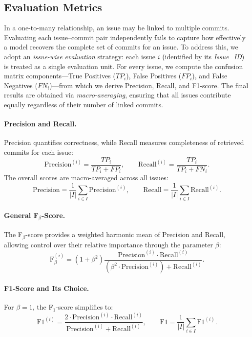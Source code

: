 
\subsection{Evaluation Metrics}

In a one-to-many relationship, an issue may be linked to multiple commits. Evaluating each issue--commit pair independently fails to capture how effectively a model recovers the complete set of commits for an issue. To address this, we adopt an \emph{issue-wise evaluation} strategy: each issue $i$ (identified by its \textit{Issue\_ID}) is treated as a single evaluation unit. For every issue, we compute the confusion matrix components—True Positives ($TP_i$), False Positives ($FP_i$), and False Negatives ($FN_i$)—from which we derive Precision, Recall, and F1-score. The final results are obtained via \emph{macro-averaging}, ensuring that all issues contribute equally regardless of their number of linked commits.

\paragraph{Precision and Recall.}
Precision quantifies correctness, while Recall measures completeness of retrieved commits for each issue:
\[
\text{Precision}^{(i)} = \frac{TP_i}{TP_i + FP_i}, \qquad
\text{Recall}^{(i)} = \frac{TP_i}{TP_i + FN_i}.
\]
The overall scores are macro-averaged across all issues:
\[
\text{Precision} = \frac{1}{|I|}\sum_{i \in I}\text{Precision}^{(i)}, \qquad
\text{Recall} = \frac{1}{|I|}\sum_{i \in I}\text{Recall}^{(i)}.
\]

\paragraph{General F$_\beta$-Score.}
The F$_\beta$-score provides a weighted harmonic mean of Precision and Recall, allowing control over their relative importance through the parameter $\beta$:
\[
\text{F}_{\beta}^{(i)} = (1+\beta^2)\frac{\text{Precision}^{(i)} \cdot \text{Recall}^{(i)}}{(\beta^2 \cdot \text{Precision}^{(i)}) + \text{Recall}^{(i)}}.
\]

\paragraph{F1-Score and Its Choice.}
For $\beta = 1$, the F$_1$-score simplifies to:
\[
\text{F1}^{(i)} = \frac{2 \cdot \text{Precision}^{(i)} \cdot \text{Recall}^{(i)}}{\text{Precision}^{(i)} + \text{Recall}^{(i)}}, \qquad
\text{F1} = \frac{1}{|I|}\sum_{i \in I}\text{F1}^{(i)}.
\]


